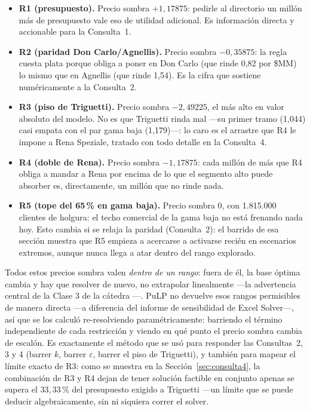 \documentclass[10pt,a4paper]{article}
\begin{document}
\begin{itemize}
  \item \textbf{R1 (presupuesto).} Precio sombra $+1{,}17875$: pedirle al
  directorio un millón más de presupuesto vale eso de utilidad adicional. Es
  información directa y accionable para la Consulta~1.
  \item \textbf{R2 (paridad Don Carlo/Agnellis).} Precio sombra $-0{,}35875$:
  la regla cuesta plata porque obliga a poner en Don Carlo (que rinde 0,82 por
  \$MM) lo mismo que en Agnellis (que rinde 1,54). Es la cifra que sostiene
  numéricamente a la Consulta~2.
  \item \textbf{R3 (piso de Triguetti).} Precio sombra $-2{,}49225$, el más
  alto en valor absoluto del modelo. No es que Triguetti rinda mal —su primer
  tramo (1,044) casi empata con el par gama baja (1,179)—: lo caro es el
  arrastre que R4 le impone a Rena Speziale, tratado con todo detalle en la
  Consulta~4.
  \item \textbf{R4 (doble de Rena).} Precio sombra $-1{,}17875$: cada millón
  de más que R4 obliga a mandar a Rena por encima de lo que el segmento alto
  puede absorber es, directamente, un millón que no rinde nada.
  \item \textbf{R5 (tope del 65\,\% en gama baja).} Precio sombra $0$, con
  1.815.000 clientes de holgura: el techo comercial de la gama baja no está
  frenando nada hoy. Esto cambia si se relaja la paridad (Consulta~2): el
  barrido de esa sección muestra que R5 empieza a acercarse a activarse recién
  en escenarios extremos, aunque nunca llega a atar dentro del rango
  explorado.
\end{itemize}

Todos estos precios sombra valen \emph{dentro de un rango}: fuera de él, la
base óptima cambia y hay que resolver de nuevo, no extrapolar linealmente
—la advertencia central de la Clase 3 de la cátedra \cite{catedra-clases}—.
PuLP no devuelve esos rangos permisibles de manera directa —a diferencia del
informe de sensibilidad de Excel Solver—, así que se los calculó
re-resolviendo paramétricamente: barriendo el término independiente de cada
restricción y viendo en qué punto el precio sombra cambia de escalón. Es
exactamente el método que se usó para responder las Consultas~2, 3 y 4 (barrer
$k$, barrer $\varepsilon$, barrer el piso de Triguetti), y también para
mapear el límite exacto de R3: como se muestra en la
Sección~\ref{sec:consulta4}, la combinación de R3 y R4 dejan de tener solución
factible en conjunto apenas se supera el $33{,}33\,\%$ del presupuesto exigido
a Triguetti —un límite que se puede deducir algebraicamente, sin ni siquiera
correr el solver.
\end{document}
